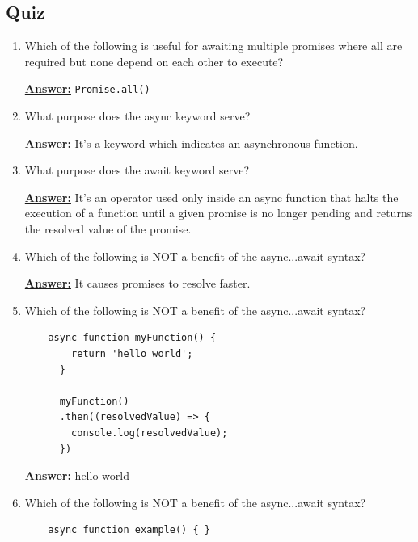 \documentclass[12pt]{article}
\begin{document}
\subsection{Quiz}
\begin{enumerate}
    \item Which of the following is useful for awaiting multiple promises where all are required but none depend on each other to execute?

    \bigskip

    \underline{\textbf{Answer:}} \texttt{Promise.all()}

    \item What purpose does the async keyword serve?

    \bigskip

    \underline{\textbf{Answer:}} It’s a keyword which indicates an asynchronous function.

    \item What purpose does the await keyword serve?

    \bigskip

    \underline{\textbf{Answer:}} It’s an operator used only inside an async function that halts the execution of a function until a given promise is no longer pending and returns the resolved value of the promise.

    \item Which of the following is NOT a benefit of the async...await syntax?

    \bigskip

    \underline{\textbf{Answer:}} It causes promises to resolve faster.

    \item Which of the following is NOT a benefit of the async...await syntax?
    \bigskip

\begin{lstlisting}
    async function myFunction() {
        return 'hello world';
      }

      myFunction()
      .then((resolvedValue) => {
        console.log(resolvedValue);
      })
\end{lstlisting}

    \bigskip

    \underline{\textbf{Answer:}} hello world

    \item Which of the following is NOT a benefit of the async...await syntax?
    \bigskip

\begin{lstlisting}
    async function example() { }
\end{lstlisting}


\end{enumerate}
\end{document}
